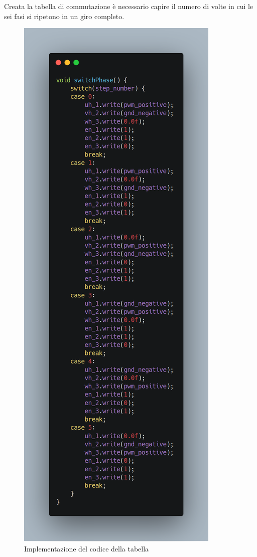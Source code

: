\documentclass[a4paper]{report}
\begin{document}
    Creata la tabella di commutazione è necessario capire il numero di volte in cui le sei fasi si ripetono in un giro completo.
    \begin{figure}[htbp]
    \centering
    \includegraphics[scale=0.1,keepaspectratio=true]{table}
    \caption{Implementazione del codice della tabella}    
    \end{figure}
\end{document}
